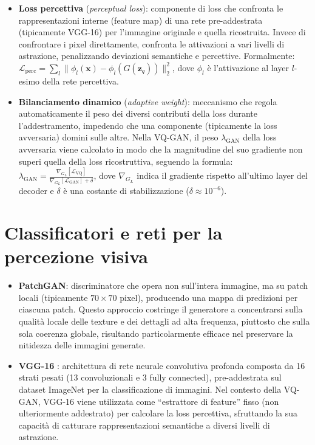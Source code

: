 \begin{itemize}
	\item \textbf{Loss percettiva} (\emph{perceptual loss}): componente di loss che confronta le rappresentazioni interne (feature map) di una rete pre-addestrata (tipicamente VGG-16) per l'immagine originale e quella ricostruita. Invece di confrontare i pixel direttamente, confronta le attivazioni a vari livelli di astrazione, penalizzando deviazioni semantiche e percettive. Formalmente: $\mathcal{L}_{\text{perc}} = \sum_{l} \|\phi_l(\mathbf{x}) - \phi_l(G(\mathbf{z}_q))\|_2^2$, dove $\phi_l$ è l'attivazione al layer $l$-esimo della rete percettiva.
	\item \textbf{Bilanciamento dinamico} (\emph{adaptive weight}): meccanismo che regola automaticamente il peso dei diversi contributi della loss durante l'addestramento, impedendo che una componente (tipicamente la loss avversaria) domini sulle altre. Nella VQ-GAN, il peso $\lambda_{\text{GAN}}$ della loss avversaria viene calcolato in modo che la magnitudine del suo gradiente non superi quella della loss ricostruttiva, seguendo la formula: $\lambda_{\text{GAN}} = \frac{\nabla_{G_L}[\mathcal{L}_{\text{VQ}}]}{\nabla_{G_L}[\mathcal{L}_{\text{GAN}}] + \delta}$, dove $\nabla_{G_L}$ indica il gradiente rispetto all'ultimo layer del decoder e $\delta$ è una costante di stabilizzazione ($\delta \approx 10^{-6}$).
\end{itemize}

\section{Classificatori e reti per la percezione visiva}
\label{sec:def-classificatori}
\begin{itemize}
	\item \textbf{PatchGAN}: discriminatore che opera non sull'intera immagine, ma su patch locali (tipicamente $70 \times 70$ pixel), producendo una mappa di predizioni per ciascuna patch. Questo approccio costringe il generatore a concentrarsi sulla qualità locale delle texture e dei dettagli ad alta frequenza, piuttosto che sulla sola coerenza globale, risultando particolarmente efficace nel preservare la nitidezza delle immagini generate.
	\item \textbf{VGG-16} \cite{simonyan-2015}: architettura di rete neurale convolutiva profonda composta da 16 strati pesati (13 convoluzionali e 3 fully connected), pre-addestrata sul dataset ImageNet per la classificazione di immagini. Nel contesto della VQ-GAN, VGG-16 viene utilizzata come ``estrattore di feature'' fisso (non ulteriormente addestrato) per calcolare la loss percettiva, sfruttando la sua capacità di catturare rappresentazioni semantiche a diversi livelli di astrazione.
\end{itemize}

